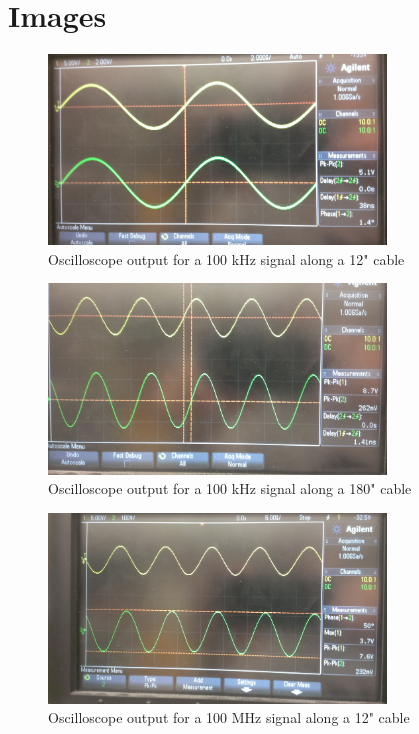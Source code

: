 \documentclass{article}
\begin{document}
\section{Images}
\begin{figure}[H]
    \centering
    \includegraphics[width=0.8\textwidth]{./Images/RoleWave1.jpg}
    \caption{Oscilloscope output for a 100 kHz signal along a 12" cable}
\end{figure}
\begin{figure}[H]
    \centering
    \includegraphics[width=0.8\textwidth]{./Images/RoleWave2.jpg}
    \caption{Oscilloscope output for a 100 kHz signal along a 180" cable}
\end{figure}
\begin{figure}[H]
    \centering
    \includegraphics[width=0.8\textwidth]{./Images/RoleWave3.jpg}
    \caption{Oscilloscope output for a 100 MHz signal along a 12" cable}
\end{figure}
\end{document}
